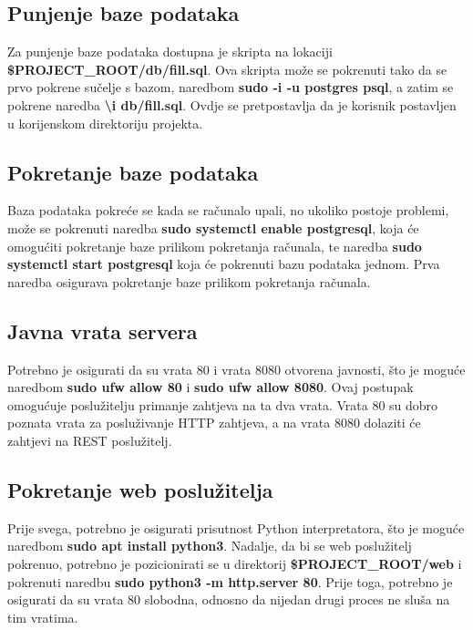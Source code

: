 		\subsection{Punjenje baze podataka}
		Za punjenje baze podataka dostupna je skripta na lokaciji \textbf{\$PROJECT\_ROOT/db/fill.sql}. Ova skripta može se pokrenuti tako da se prvo pokrene sučelje s bazom, naredbom \textbf{sudo -i -u postgres psql}, a zatim se pokrene naredba \textbf{\textbackslash i db/fill.sql}. Ovdje se pretpostavlja da je korisnik postavljen u korijenskom direktoriju projekta.
		
		\subsection{Pokretanje baze podataka}
		Baza podataka pokreće se kada se računalo upali, no ukoliko postoje problemi, može se pokrenuti naredba \textbf{sudo systemctl enable postgresql}, koja će omogućiti pokretanje baze prilikom pokretanja računala, te naredba \textbf{sudo systemctl start postgresql} koja će pokrenuti bazu podataka jednom. Prva naredba osigurava pokretanje baze prilikom pokretanja računala.
		
		\subsection{Javna vrata servera}
		Potrebno je osigurati da su vrata 80 i vrata 8080 otvorena javnosti, što je moguće naredbom \textbf{sudo ufw allow 80} i \textbf{sudo ufw allow 8080}. Ovaj postupak omogućuje poslužitelju primanje zahtjeva na ta dva vrata. Vrata 80 su dobro poznata vrata za posluživanje HTTP zahtjeva, a na vrata 8080 dolaziti će zahtjevi na REST poslužitelj.
		
		\subsection{Pokretanje web poslužitelja}
		Prije svega, potrebno je osigurati prisutnost Python interpretatora, što je moguće naredbom \textbf{sudo apt install python3}. Nadalje, da bi se web poslužitelj pokrenuo, potrebno je pozicionirati se u direktorij \textbf{\$PROJECT\_ROOT/web} i pokrenuti naredbu \textbf{sudo python3 -m http.server 80}. Prije toga, potrebno je osigurati da su vrata 80 slobodna, odnosno da nijedan drugi proces ne sluša na tim vratima.
		
